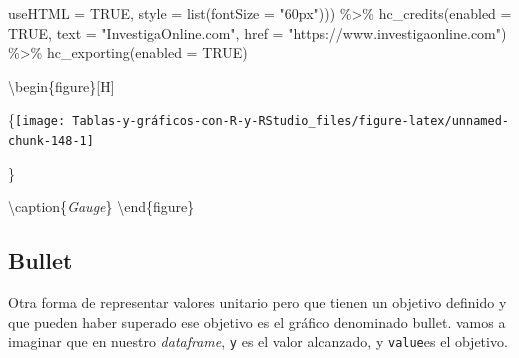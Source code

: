 \documentclass[
]{book}
\newenvironment{Shaded}{\begin{snugshade}}{\end{snugshade}}
\newcommand{\AttributeTok}[1]{\textcolor[rgb]{0.77,0.63,0.00}{#1}}
\newcommand{\ConstantTok}[1]{\textcolor[rgb]{0.00,0.00,0.00}{#1}}
\newcommand{\FunctionTok}[1]{\textcolor[rgb]{0.00,0.00,0.00}{#1}}
\newcommand{\NormalTok}[1]{#1}
\newcommand{\SpecialCharTok}[1]{\textcolor[rgb]{0.00,0.00,0.00}{#1}}
\newcommand{\StringTok}[1]{\textcolor[rgb]{0.31,0.60,0.02}{#1}}
\begin{document}
\begin{Shaded}
\begin{Highlighting}[]
    \AttributeTok{useHTML =} \ConstantTok{TRUE}\NormalTok{, }\AttributeTok{style =} \FunctionTok{list}\NormalTok{(}\AttributeTok{fontSize =} \StringTok{"60px"}\NormalTok{))) }\SpecialCharTok{\%\textgreater{}\%} 
  \FunctionTok{hc\_credits}\NormalTok{(}\AttributeTok{enabled =} \ConstantTok{TRUE}\NormalTok{, }\AttributeTok{text =} \StringTok{"InvestigaOnline.com"}\NormalTok{, }
    \AttributeTok{href =} \StringTok{"https://www.investigaonline.com"}\NormalTok{) }\SpecialCharTok{\%\textgreater{}\%} \FunctionTok{hc\_exporting}\NormalTok{(}\AttributeTok{enabled =} \ConstantTok{TRUE}\NormalTok{)}
\end{Highlighting}
\end{Shaded}

\textbackslash begin\{figure\}{[}H{]}

\{\centering \texttt{[image: Tablas-y-gráficos-con-R-y-RStudio\_files/figure-latex/unnamed-chunk-148-1]}

\}

\textbackslash caption\{\emph{Gauge}\}\label{fig:unnamed-chunk-148}
\textbackslash end\{figure\}

\hypertarget{bullet}{%
\subsection{Bullet}\label{bullet}}

Otra forma de representar valores unitario pero que tienen un objetivo definido y que pueden haber superado ese objetivo es el gráfico denominado bullet. vamos a imaginar que en nuestro \emph{dataframe}, \texttt{y} es el valor alcanzado, y \texttt{value}es el objetivo.
\end{document}
